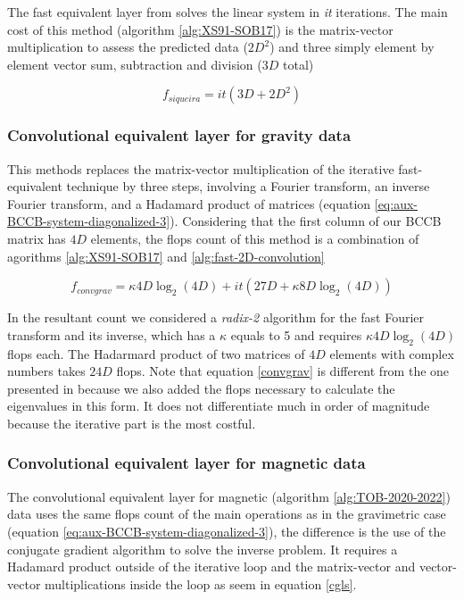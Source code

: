 The fast equivalent layer from \cite{siqueira-etal2017} solves the linear system in \textit{it} iterations. The main cost of this method (algorithm \ref{alg:XS91-SOB17}) is the matrix-vector multiplication to assess the predicted data ($2D^2$) and three simply element by element vector sum, subtraction and division ($3D$ total)

\begin{equation}
	f_{siqueira} = it(3D +2D^2)
	\label{siqueira}
\end{equation}

\subsubsection{Convolutional equivalent layer for gravity data \citep{takahashi2020}}

This methods replaces the matrix-vector multiplication of the iterative fast-equivalent technique \citep{siqueira-etal2017} by three steps, involving a Fourier transform, an inverse Fourier transform, and a Hadamard product of matrices (equation \ref{eq:aux-BCCB-system-diagonalized-3}). Considering that the first column of our BCCB matrix has $4D$ elements, the flops count of this method is a combination of agorithms \ref{alg:XS91-SOB17} and \ref{alg:fast-2D-convolution}

\begin{equation}
	f_{convgrav} = \kappa4D\log_2(4D) + it(27D + \kappa8D\log_2(4D))
\label{convgrav}
\end{equation}

In the resultant count we considered a \textit{radix-2} algorithm for the fast Fourier transform and its inverse, which has a $\kappa$ equals to 5 and requires $\kappa4D\log_2(4D)$ flops each. The Hadarmard product of two matrices of $4D$ elements with complex numbers takes $24D$ flops. Note that equation \ref{convgrav} is different from the one presented in \cite{takahashi2020} because we also added the flops necessary to calculate the  eigenvalues in this form. It does not differentiate much in order of magnitude because the iterative part is the most costful.

\subsubsection{Convolutional equivalent layer for magnetic data \citep{takahashi2022}}

The convolutional equivalent layer for magnetic (algorithm \ref{alg:TOB-2020-2022}) data uses the same flops count of the main operations as in the gravimetric case (equation \ref{eq:aux-BCCB-system-diagonalized-3}), the difference is the use of the conjugate gradient algorithm to solve the inverse problem. It requires a Hadamard product outside of the iterative loop and the matrix-vector and vector-vector multiplications inside the loop as seem in equation \ref{cgls}.

